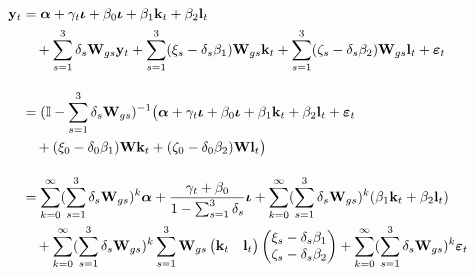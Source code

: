 \begin{align}
    \mathbf y_t &= \boldsymbol \alpha
                    + \gamma_t \boldsymbol \iota
                    + \beta_0 \boldsymbol \iota
                    + \beta_1 \mathbf k_{t}
                    + \beta_2 \mathbf l_{t}
                    \\ & \quad \notag
                    + \sum_{s=1}^3 \delta_s \mathbf W_{gs} \mathbf y_t
                    + \sum_{s=1}^3 (\xi_s-\delta_s\beta_1) \mathbf W_{gs} \mathbf k_t
                    + \sum_{s=1}^3 (\zeta_s-\delta_s\beta_2) \mathbf W_{gs} \mathbf l_t 
                    + \boldsymbol \varepsilon_{t}
    \\[1em] \notag
            &= (\mathbb I - \sum_{s=1}^3\delta_s \mathbf W_{gs})^{-1} \big(
                    \boldsymbol \alpha
                    + \gamma_t \boldsymbol \iota
                    + \beta_0 \boldsymbol \iota
                    + \beta_1 \mathbf k_{t}
                    + \beta_2 \mathbf l_{t}
                    + \boldsymbol \varepsilon_{t}
                    \\ & \quad \notag
                    + (\xi_0-\delta_0\beta_1) \mathbf W \mathbf k_t
                    + (\zeta_0-\delta_0\beta_2) \mathbf W \mathbf l_t 
                \big)
    \\[1em]
            &=   \sum_{k=0}^\infty(\sum_{s=1}^3\delta_s \mathbf W_{gs})^k
                        \boldsymbol \alpha
                    +\frac{\gamma_t + \beta_0}{1-\sum_{s=1}^3\delta_s}\boldsymbol \iota
                    + \sum_{k=0}^\infty (\sum_{s=1}^3\delta_s \mathbf W_{gs})^k
                        (\beta_1 \mathbf k_{t} + \beta_2 \mathbf l_{t})
                    \\ & \quad \notag
                    + \sum_{k=0}^\infty
                        (\sum_{s=1}^3 \delta_s \mathbf W_{gs})^k
                        \sum_{s=1}^3 \mathbf W_{gs}
                        \begin{pmatrix}\mathbf k_t & \mathbf l_t\end{pmatrix}
                        \begin{pmatrix}
                            \xi_s-\delta_s\beta_1       \\
                            \zeta_s-\delta_s\beta_2
                        \end{pmatrix}
                    + \sum_{k=0}^\infty (\sum_{s=1}^3\delta_s \mathbf W_{gs})^k
                        \boldsymbol \varepsilon_{t}
    \\[1em]
    \label{eq:static-3r-endogenous-effect}

\end{align}
